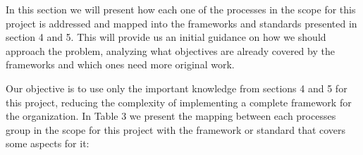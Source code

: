 In this section we will present how each one of the processes in the scope for this project is addressed and mapped into the frameworks and standards presented in section 4 and 5. This will provide us an initial guidance on how we should approach the problem, analyzing what objectives are already covered by the frameworks and which ones need more original work.\par
Our objective is to use only the important knowledge from sections 4 and 5 for this project, reducing the complexity of implementing a complete framework for the organization. In Table 3 we present the mapping between each processes group in the scope for this project with the framework or standard that covers some aspects for it:\par

\begin{table}[h!]
\centering
{}
\end{table}
